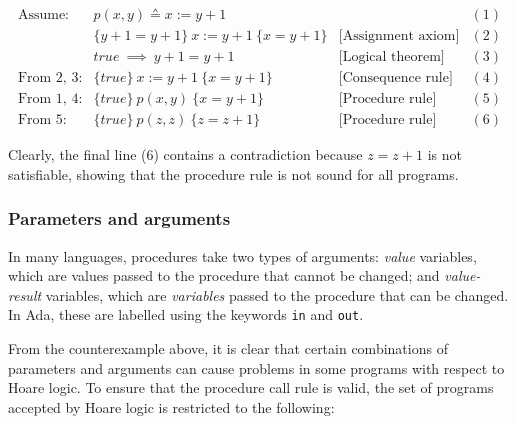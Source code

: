 \begin{example}

\begin{displaymath}
  \begin{array}{lllll}
\textrm{Assume:} & p(x, y) \sdef x := y + 1 & & (1)\\[2mm]
                 & \{y + 1 = y + 1\}~ x := y + 1~ \{x = y + 1\} & \textrm{[Assignment axiom]} & (2)\\[2mm]
                 & true ~\implies ~ y + 1 = y + 1 & \textrm{[Logical theorem]} & (3)\\[2mm]
 \textrm{From 2, 3:} & \{true\}~ x := y + 1~ \{x = y + 1\} & \textrm{[Consequence rule]} & (4)\\[2mm]
 \textrm{From 1, 4:} & \{true\}~ p(x,y)~ \{ x = y + 1\} & \textrm{[Procedure rule]} & (5)\\[2mm]
 \textrm{From 5:}    & \{true\}~ p(z,z)~ \{ z = z + 1\} & \textrm{[Procedure rule]} & (6)
\end{array}
\end{displaymath}

Clearly, the final line (6) contains a contradiction because $z = z + 1$ is not satisfiable, showing that the procedure rule is not sound for all programs.

\end{example}

\subsubsection*{Parameters and arguments}

In many languages, procedures take two types of arguments: \emph{value} variables, which are values passed to the procedure that cannot be changed; and \emph{value-result} variables, which are \emph{variables} passed to the procedure that can be changed. In Ada, these are labelled using the keywords \texttt{in} and \texttt{out}.

From the counterexample above, it is clear that certain combinations of parameters and arguments can cause problems in some programs with respect to Hoare logic. To ensure that the procedure call rule is valid, the set of programs accepted by Hoare logic is restricted to the following:

